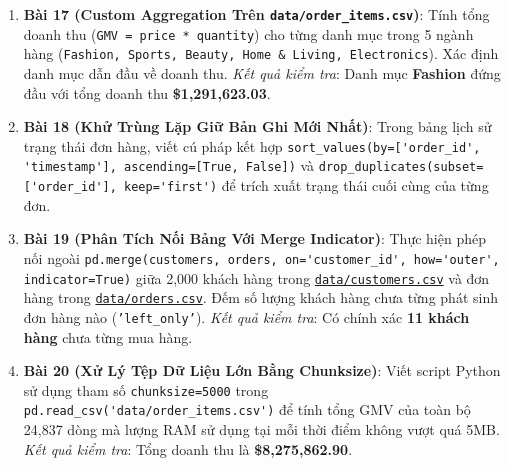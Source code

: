 \begin{baitapbox}
\begin{enumerate}
    \item \textbf{Bài 17 (Custom Aggregation Trên \texttt{data/order\_items.csv})}: Tính tổng doanh thu (\texttt{GMV = price * quantity}) cho từng danh mục trong 5 ngành hàng (\texttt{Fashion, Sports, Beauty, Home \& Living, Electronics}). Xác định danh mục dẫn đầu về doanh thu. \textit{Kết quả kiểm tra}: Danh mục \textbf{Fashion} đứng đầu với tổng doanh thu \textbf{\$1,291,623.03}.
    \item \textbf{Bài 18 (Khử Trùng Lặp Giữ Bản Ghi Mới Nhất)}: Trong bảng lịch sử trạng thái đơn hàng, viết cú pháp kết hợp \lstinline|sort_values(by=['order_id', 'timestamp'], ascending=[True, False])| và \lstinline|drop_duplicates(subset=['order_id'], keep='first')| để trích xuất trạng thái cuối cùng của từng đơn.
    \item \textbf{Bài 19 (Phân Tích Nối Bảng Với Merge Indicator)}: Thực hiện phép nối ngoài \lstinline|pd.merge(customers, orders, on='customer_id', how='outer', indicator=True)| giữa 2,000 khách hàng trong \href{run:./data/customers.csv}{\texttt{data/customers.csv}} và đơn hàng trong \href{run:./data/orders.csv}{\texttt{data/orders.csv}}. Đếm số lượng khách hàng chưa từng phát sinh đơn hàng nào (\texttt{'left\_only'}). \textit{Kết quả kiểm tra}: Có chính xác \textbf{11 khách hàng} chưa từng mua hàng.
    \item \textbf{Bài 20 (Xử Lý Tệp Dữ Liệu Lớn Bằng Chunksize)}: Viết script Python sử dụng tham số \texttt{chunksize=5000} trong \lstinline|pd.read_csv('data/order_items.csv')| để tính tổng GMV của toàn bộ 24,837 dòng mà lượng RAM sử dụng tại mỗi thời điểm không vượt quá 5MB. \textit{Kết quả kiểm tra}: Tổng doanh thu là \textbf{\$8,275,862.90}.
\end{enumerate}
\end{baitapbox}

